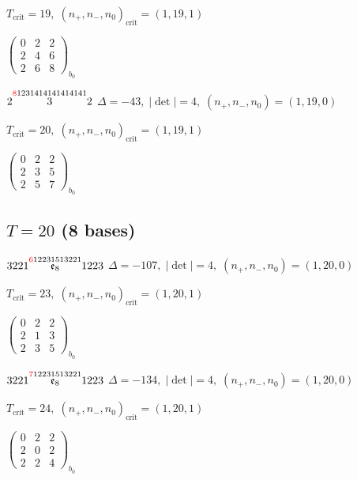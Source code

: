 \documentclass[10pt]{article}
\begin{document}
\hspace{1em}$T_{\text{crit}}=19,\; (n_+,n_-,n_0)_{\text{crit}}=(1,19,1)$

\hspace{2em}$\left(\begin{smallmatrix}0 & 2 & 2 \\ 2 & 4 & 6 \\ 2 & 6 & 8\end{smallmatrix}\right)_{\!b_0}$

$2\overset{\textcolor{red}{8}1231414141414141}{3}2$ \quad $\Delta=-43,\; |\det|=4,\; (n_+,n_-,n_0)=(1,19,0)$

\hspace{1em}$T_{\text{crit}}=20,\; (n_+,n_-,n_0)_{\text{crit}}=(1,19,1)$

\hspace{2em}$\left(\begin{smallmatrix}0 & 2 & 2 \\ 2 & 3 & 5 \\ 2 & 5 & 7\end{smallmatrix}\right)_{\!b_0}$


\subsection*{$T = 20$ \quad (8 bases)}
\smallskip

$3221\overset{\textcolor{red}{6}12231513221}{\mathfrak{e}_8}1223$ \quad $\Delta=-107,\; |\det|=4,\; (n_+,n_-,n_0)=(1,20,0)$

\hspace{1em}$T_{\text{crit}}=23,\; (n_+,n_-,n_0)_{\text{crit}}=(1,20,1)$

\hspace{2em}$\left(\begin{smallmatrix}0 & 2 & 2 \\ 2 & 1 & 3 \\ 2 & 3 & 5\end{smallmatrix}\right)_{\!b_0}$

$3221\overset{\textcolor{red}{7}12231513221}{\mathfrak{e}_8}1223$ \quad $\Delta=-134,\; |\det|=4,\; (n_+,n_-,n_0)=(1,20,0)$

\hspace{1em}$T_{\text{crit}}=24,\; (n_+,n_-,n_0)_{\text{crit}}=(1,20,1)$

\hspace{2em}$\left(\begin{smallmatrix}0 & 2 & 2 \\ 2 & 0 & 2 \\ 2 & 2 & 4\end{smallmatrix}\right)_{\!b_0}$
\end{document}
